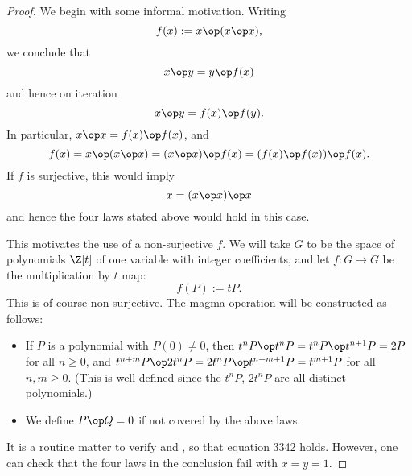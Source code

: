 \begin{proof}
We begin with some informal motivation. Writing
\begin{equation}\label{fdef}
  f(x) := x \op (x \op x),
\end{equation}
we conclude that
\begin{equation}\label{xop}
   x \op y = y \op f(x)
\end{equation}
and hence on iteration
$$ x \op y = f(x) \op f(y).$$
In particular, $x \op x = f(x) \op f(x)$, and
$$ f(x) = x \op (x \op x) = (x \op x) \op f(x) = (f(x) \op f(x)) \op f(x).$$
If $f$ is surjective, this would imply
$$ x = (x \op x) \op x$$
and hence the four laws stated above would hold in this case.

This motivates the use of a non-surjective $f$.  We will take $G$ to be the space of polynomials $\Z[t]$ of one variable with integer coefficients, and let $f: G \to G$ be the multiplication by $t$ map:
$$ f(P) := tP.$$
This is of course non-surjective. The magma operation will be constructed as follows:
\begin{itemize}
  \item If $P$ is a polynomial with $P(0) \neq 0$, then $t^n P \op t^n P = t^n P \op t^{n+1} P = 2P$ for all $n \geq 0$, and $t^{n+m} P \op 2t^n P = 2t^n P \op t^{n+m+1} P = t^{m+1} P$ for all $n, m \geq 0$.  (This is well-defined since the $t^n P$, $2t^n P$ are all distinct polynomials.)
  \item We define $P \op Q = 0$ if not covered by the above laws.
\end{itemize}

It is a routine matter to verify  and , so that equation 3342 holds.  However, one can check that the four laws in the conclusion fail with $x=y=1$.
\end{proof}

